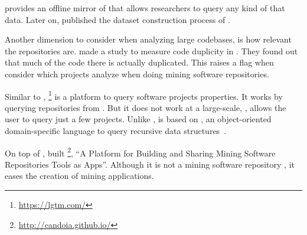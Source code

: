 \cite{gousios_ghtorent_2013}
provides an offline mirror of \github{} that allows researchers to query any kind of that data.
Later on, \cite{gousios_lean_2014} published the dataset construction process of \github{}.

Another dimension to consider when analyzing large codebases, is how relevant the repositories are.
\cite{lopes_dejavu:_2017} made a study to measure code duplicity in \github{}.
They found out that much of the code there is actually duplicated.
This raises a flag when consider which projects analyze when doing mining software repositories.

Similar to \boa{}, \lgtm{}\footnote{\url{https://lgtm.com/}} is a platform to query software projects properties.
It works by querying repositories from \github{}.
But it does not work at a large-scale, \ie{}, \lgtm{} allows the user to query just a few projects.
Unlike \boa{}, \lgtm{} is based on \ql{}, an object-oriented domain-specific language to query recursive data structures~\cite{avgustinov_ql:_2016}.

On top of \boa{}, \cite{tiwari_candoia:_2017} built \candoia{}\footnote{\url{http://candoia.github.io/}}, ``A Platform for Building and Sharing Mining Software Repositories Tools as Apps''.
Although it is not a mining software repository \perse{}, it eases the creation of mining applications.


